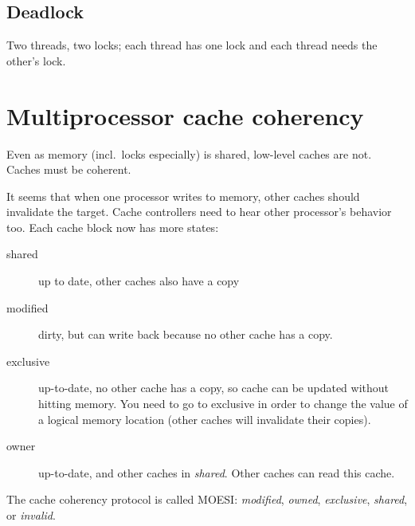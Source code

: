\subsection{Deadlock}
Two threads, two locks; each thread has one lock and each thread needs the other's lock.

\section{Multiprocessor cache coherency}
Even as memory (incl.~locks especially) is shared, low-level caches are not. Caches must be coherent.

It seems that when one processor writes to memory, other caches should invalidate the target. Cache controllers need to hear other processor's behavior too.
Each cache block now has more states:
\begin{description}
	\item[shared] up to date, other caches also have a copy
	\item[modified] dirty, but can write back because no other cache has a copy.
	\item[exclusive] up-to-date, no other cache has a copy, so cache can be updated without hitting memory. You need to go to exclusive in order to change the value of a logical memory location (other caches will invalidate their copies).
	\item[owner] up-to-date, and other caches in \emph{shared}. Other caches can read this cache.
\end{description}
The cache coherency protocol is called MOESI: \emph{modified}, \emph{owned}, \emph{exclusive}, \emph{shared}, or \emph{invalid}.